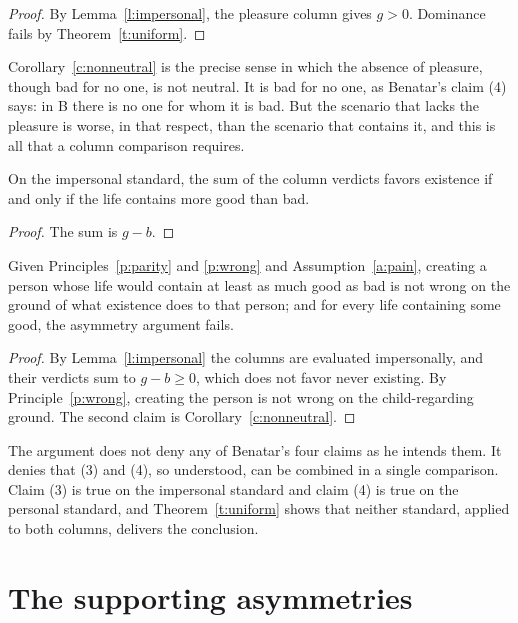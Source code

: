 \documentclass{situationist-preprint}
\begin{document}
\begin{proof}
By Lemma~\ref{l:impersonal}, the pleasure column gives $g > 0$. Dominance fails by Theorem~\ref{t:uniform}.
\end{proof}

Corollary~\ref{c:nonneutral} is the precise sense in which the absence of pleasure, though bad for no one, is not neutral. It is bad for no one, as Benatar's claim (4) says: in B there is no one for whom it is bad. But the scenario that lacks the pleasure is worse, in that respect, than the scenario that contains it, and this is all that a column comparison requires.

\begin{proposition}\label{p:overall}
On the impersonal standard, the sum of the column verdicts favors existence if and only if the life contains more good than bad.
\end{proposition}

\begin{proof}
The sum is $g - b$.
\end{proof}

\begin{theorem}\label{t:main}
Given Principles~\ref{p:parity} and \ref{p:wrong} and Assumption~\ref{a:pain}, creating a person whose life would contain at least as much good as bad is not wrong on the ground of what existence does to that person; and for every life containing some good, the asymmetry argument fails.
\end{theorem}

\begin{proof}
By Lemma~\ref{l:impersonal} the columns are evaluated impersonally, and their verdicts sum to $g - b \ge 0$, which does not favor never existing. By Principle~\ref{p:wrong}, creating the person is not wrong on the child-regarding ground. The second claim is Corollary~\ref{c:nonneutral}.
\end{proof}

The argument does not deny any of Benatar's four claims as he intends them. It denies that (3) and (4), so understood, can be combined in a single comparison. Claim (3) is true on the impersonal standard and claim (4) is true on the personal standard, and Theorem~\ref{t:uniform} shows that neither standard, applied to both columns, delivers the conclusion.

\section{The supporting asymmetries}
\end{document}
